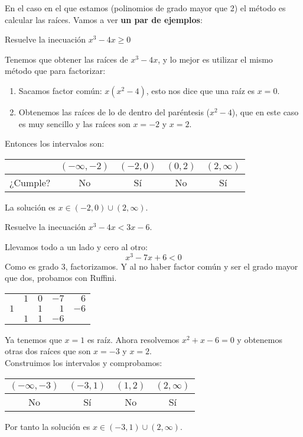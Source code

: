 \documentclass[a4paper,11pt,answers]{exam}
\begin{document}
En el caso en el que estamos (polinomios de grado mayor que 2) el método es calcular las raíces.
Vamos a ver \textbf{un par de ejemplos}:
\begin{questions}
\question Resuelve la inecuación $x^3 - 4x \geq 0$
  \begin{solution}
    Tenemos que obtener las raíces de $x^3 -4x$, y lo mejor es utilizar el mismo método que para
    factorizar:
    \begin{enumerate}
    \item Sacamos factor común: $x(x^2 - 4)$, esto nos dice que una raíz es $x=0$.
    \item Obtenemos las raíces de lo de dentro del paréntesis ($x^2 - 4$), que en este caso es
      muy sencillo y las raíces son $x= -2$ y $x=2$.
    \end{enumerate}
    Entonces los intervalos son:
    \begin{center}
      \begin{tabular}{l|c|c|c|c|}
        &$(-\infty, -2)$&$(-2,0)$&$(0,2)$&$(2, \infty)$\\
        \hline
        ¿Cumple?&No&Sí&No&Sí
      \end{tabular}
    \end{center}
    La solución es $x \in (-2,0) \cup (2, \infty)$.
  \end{solution}
\question Resuelve la inecuación $x^3 - 4x < 3x - 6$.
  \begin{solution}
    Llevamos todo a un lado y cero al otro:
    \[x^3 - 7x + 6 < 0\]
    Como es grado 3, factorizamos. Y al no haber factor común y ser el grado mayor que dos,
    probamos con Ruffini.
    \begin{center}
      \begin{tabular}{r|rrrr}
        &$1$&$0$&$-7$&$6$\\
        $1$&&$1$&$1$&$-6$\\
        \hline
        &$1$&$1$&$-6$&
      \end{tabular}
    \end{center}
    Ya tenemos que $x=1$ es raíz. Ahora resolvemos $x^2 + x -6 = 0$ y obtenemos otras dos raíces
    que son $x = -3$ y $x = 2$.\\

    Construimos los intervalos y comprobamos:
    \begin{center}
      \begin{tabular}{c|c|c|c}
        $(-\infty, -3)$&$(-3, 1)$&$(1,2)$&$(2, \infty)$\\
        \hline
        No&Sí&No&Sí
      \end{tabular}
    \end{center}
    Por tanto la solución es $x \in (-3,1) \cup (2, \infty)$.
  \end{solution}
\end{questions}
\end{document}
